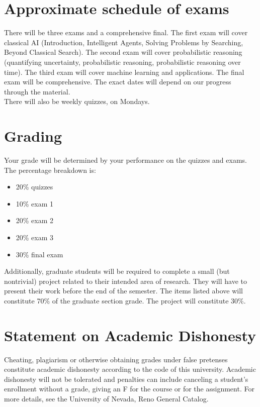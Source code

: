 \documentclass{article}
\begin{document}
\section*{Approximate schedule of exams}

There will be three exams and a comprehensive final. The first exam
will cover classical AI (Introduction, Intelligent Agents, Solving
Problems by Searching, Beyond Classical Search). The second exam will
cover probabilistic reasoning (quantifying uncertainty, probabilistic
reasoning, probabilistic reasoning over time). The third exam will
cover machine learning and applications. The final exam will be
comprehensive. The exact dates will depend on our progress through the
material.\\

\noindent
There will also be weekly quizzes, on Mondays.

\section*{Grading}

Your grade will be determined by your performance on the quizzes and
exams. The percentage breakdown is:

\begin{itemize}
  \item 20\% quizzes
  \item 10\% exam 1
  \item 20\% exam 2
  \item 20\% exam 3
  \item 30\% final exam
\end{itemize}

Additionally, graduate students will be required to complete a small
(but nontrivial) project related to their intended area of
research. They will have to present their work before the end of the
semester. The items listed above will constitute 70\% of the graduate
section grade. The project will constitute 30\%.

\section*{Statement on Academic Dishonesty}
Cheating, plagiarism or otherwise obtaining grades under false
pretenses constitute academic dishonesty according to the code of this
university. Academic dishonesty will not be tolerated and penalties
can include canceling a student's enrollment without a grade, giving
an F for the course or for the assignment. For more details, see the
University of Nevada, Reno General Catalog.
\end{document}
